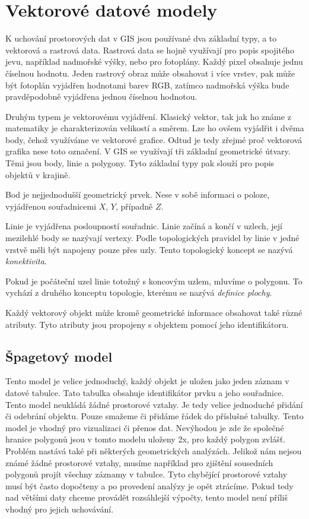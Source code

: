 \chapter{Vektorové datové modely}
\label{chap:vektorovedatovemodely}
	K uchování prostorových dat v GIS jsou používané dva základní typy, a to vektorová a rastrová data. Rastrová data se hojně využívají pro popis spojitého jevu, například nadmořské výšky, nebo pro fotoplány. Každý pixel obsahuje jednu číselnou hodnotu. Jeden rastrový obraz může obsahovat i více vrstev, pak může být fotoplán vyjádřen hodnotami barev RGB, zatímco nadmořská výška bude pravděpodobně vyjádřena jednou číselnou hodnotou.
	
	Druhým typem je vektorovému vyjádření. Klasický vektor, tak jak ho známe z matematiky je charakterizován velikostí a směrem. Lze ho ovšem vyjádřit i dvěma body, čehož využíváme ve vektorové grafice. Odtud je tedy zřejmé proč vektorová grafika nese toto označení. V GIS se využívají tři základní geometrické útvary. Těmi jsou body, linie a polygony. Tyto základní typy pak slouží pro popis objektů v krajině.
	
	Bod je nejjednodušší geometrický prvek. Nese v sobě informaci o poloze, vyjádřenou souřadnicemi $X$, $Y$, případně $Z$.
	
	Linie je vyjádřena posloupností souřadnic. Linie začíná a končí v uzlech, její mezilehlé body se nazývají vertexy. Podle topologických pravidel by linie v jedné vrstvě měli být napojeny pouze přes uzly. Tento topologický koncept se nazývá \textit{konektivita}.
	
	Pokud je počáteční uzel linie totožný s koncovým uzlem, mluvíme o polygonu. To vychází z druhého konceptu topologie, kterému se nazývá \textit{definice plochy}.
	
	Každý vektorový objekt může kromě geometrické informace obsahovat také různé atributy. Tyto atributy jsou propojeny s objektem pomocí jeho identifikátoru. \cite{kolar2003geograficke} \cite{tucek1997geograficke} \cite{vesely2007thesis}
	
\section{Špagetový model}
	Tento model je velice jednoduchý, každý objekt je uložen jako jeden záznam v datové tabulce. Tato tabulka obsahuje identifikátor prvku a jeho souřadnice. Tento model neukládá žádné prostorové vztahy. Je tedy velice jednoduché přidání či odebrání objektu. Pouze smažeme či přidáme řádek do příslušné tabulky. Tento model je vhodný pro vizualizaci či přenos dat. Nevýhodou je zde že společné hranice polygonů jsou v tomto modelu uloženy 2x, pro každý polygon zvlášť. Problém nastává také při některých geometrických analýzách. Jelikož nám nejsou známé žádné prostorové vztahy, musíme například pro zjištění sousedních polygonů projít všechny záznamy v tabulce. Tyto chybějící prostorové vztahy musí být často dopočteny a po provedení analýzy je opět ztrácíme. Pokud tedy nad většími daty chceme provádět rozsáhlejší výpočty, tento model není příliš vhodný pro jejich uchovávání. \cite{QGIS_software} \cite{tucek1997geograficke} \cite{kolar2003geograficke} \cite{vesely2007thesis}
	
